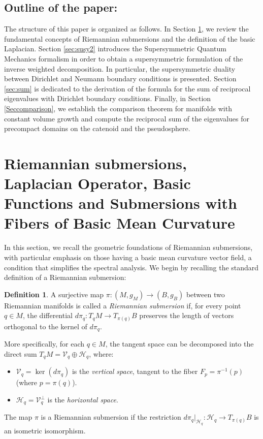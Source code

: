 \documentclass{amsart}
\theoremstyle{definition}
\newtheorem{definition}[theorem]{Definition}
\theoremstyle{remark}
\numberwithin{equation}{section}
\begin{document}
\subsection*{Outline of the paper:}

The structure of this paper is organized as follows. In Section \ref{sec:sub}, we review the fundamental concepts of Riemannian submersions and the definition of the basic Laplacian. Section \ref{sec:susy2} introduces the Supersymmetric Quantum Mechanics formalism in order to obtain a supersymmetric formulation of the inverse weighted decomposition. In particular, the supersymmetric duality between Dirichlet and Neumann boundary conditions is presented. Section \ref{sec:sum} is dedicated to the derivation of the formula for the sum of reciprocal eigenvalues with Dirichlet boundary conditions. Finally, in Section \ref{Seccomparison}, we establish the comparison theorem for manifolds with constant volume growth and compute the reciprocal sum of the eigenvalues for precompact domains on the catenoid and the pseudosphere.


\section{Riemannian submersions, Laplacian Operator, Basic Functions and Submersions with Fibers of Basic Mean Curvature}\label{sec:sub}

In this section, we recall the geometric foundations of Riemannian submersions, with particular emphasis on those having a basic mean curvature vector field, a condition that simplifies the spectral analysis. We begin by recalling the standard definition of a Riemannian submersion:

\begin{definition}
A surjective map $\pi: (M, g_M) \to (B, g_B)$ between two Riemannian manifolds is called a \emph{Riemannian submersion} if, for every point $q \in M$, the differential $d\pi_q: T_qM \to T_{\pi(q)}B$ preserves the length of vectors orthogonal to the kernel of $d\pi_q$. 
\end{definition}

More specifically, for each $q \in M$, the tangent space can be decomposed into the direct sum $T_qM = \mathcal{V}_q \oplus \mathcal{H}_q$, where:
\begin{itemize}
 \item $\mathcal{V}_q = \ker(d\pi_q)$ is the \emph{vertical space}, tangent to the fiber $F_p = \pi^{-1}(p)$ (where $p=\pi(q)$).
 \item $\mathcal{H}_q = \mathcal{V}_q^\perp$ is the \emph{horizontal space}.
\end{itemize}
The map $\pi$ is a Riemannian submersion if the restriction $d\pi_q|_{\mathcal{H}_q}: \mathcal{H}_q \to T_{\pi(q)}B$ is an isometric isomorphism.
\end{document}
